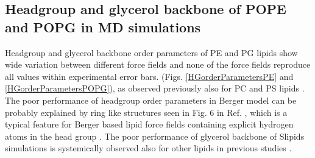 \documentclass[aps,prl,superscriptaddress,twocolumn]{revtex4}
\begin{document}
\subsection{Headgroup and glycerol backbone of POPE and POPG in MD simulations}
Headgroup and glycerol backbone order parameters of PE and PG lipids
show wide variation between different force fields
and none of the force fields reproduce all values within experimental error bars.
(Figs. \ref{HGorderParametersPE} and \ref{HGorderParametersPOPG}),
as observed previously also for PC and PS lipids \cite{botan15,antila19}.
The poor performance of headgroup order parameters in Berger model can be probably explained by
ring like structures seen in Fig. 6 in Ref. , which is a typical feature
for Berger based lipid force fields containing explicit hydrogen atoms in the head group \cite{zhao08,henin09,dahlberg10}.
The poor performance of glycerol backbone of Slipids simulations is systemically observed also
for other lipids in previous studies \cite{botan15,antila19}.
\end{document}
